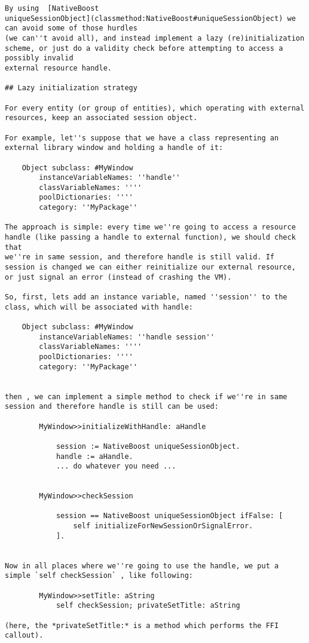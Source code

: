 \documentclass[a4paper,10pt,twoside]{book}
\begin{document}
\begin{verbatim}
By using  [NativeBoost
uniqueSessionObject](classmethod:NativeBoost#uniqueSessionObject) we
can avoid some of those hurdles
(we can''t avoid all), and instead implement a lazy (re)initialization
scheme, or just do a validity check before attempting to access a
possibly invalid
external resource handle.

## Lazy initialization strategy

For every entity (or group of entities), which operating with external
resources, keep an associated session object.

For example, let''s suppose that we have a class representing an
external library window and holding a handle of it:

	Object subclass: #MyWindow
		instanceVariableNames: ''handle''
		classVariableNames: ''''
		poolDictionaries: ''''
		category: ''MyPackage''

The approach is simple: every time we''re going to access a resource
handle (like passing a handle to external function), we should check
that
we''re in same session, and therefore handle is still valid. If
session is changed we can either reinitialize our external resource,
or just signal an error (instead of crashing the VM).

So, first, lets add an instance variable, named ''session'' to the
class, which will be associated with handle:

	Object subclass: #MyWindow
		instanceVariableNames: ''handle session''
		classVariableNames: ''''
		poolDictionaries: ''''
		category: ''MyPackage''


then , we can implement a simple method to check if we''re in same
session and therefore handle is still can be used:

		MyWindow>>initializeWithHandle: aHandle

			session := NativeBoost uniqueSessionObject.
			handle := aHandle.
			... do whatever you need ...
	

		MyWindow>>checkSession

			session == NativeBoost uniqueSessionObject ifFalse: [
				self initializeForNewSessionOrSignalError.
			].


Now in all places where we''re going to use the handle, we put a
simple `self checkSession` , like following:

		MyWindow>>setTitle: aString		
			self checkSession; privateSetTitle: aString
			
(here, the *privateSetTitle:* is a method which performs the FFI callout).


\end{verbatim}
\end{document}
